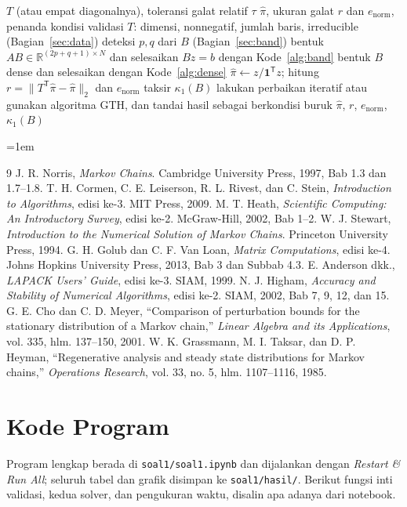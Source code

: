 \documentclass[12pt,a4paper]{article}
\newcommand{\R}{\mathbb{R}}
\newcommand{\T}{\mathsf{T}}
\numberwithin{equation}{section}
\begin{document}
\begin{algorithm}[H]
\caption{Alur yang disarankan untuk menghitung distribusi steady state}
\label{alg:rekomendasi}
\begin{algorithmic}[1]
\Require $T$ (atau empat diagonalnya), toleransi galat relatif $\tau$
\Ensure $\hat\pi$, ukuran galat $r$ dan $e_{\mathrm{norm}}$, penanda kondisi
\State validasi $T$: dimensi, nonnegatif, jumlah baris, irreducible (Bagian~\ref{sec:data})
\State deteksi $p,q$ dari $B$ (Bagian~\ref{sec:band})
  \State bentuk $AB\in\R^{(2p+q+1)\times N}$ dan selesaikan $Bz=b$ dengan Kode~\ref{alg:band}
\Else
  \State bentuk $B$ dense dan selesaikan dengan Kode~\ref{alg:dense}
\EndIf
\State $\hat\pi\gets z/\mathbf1^\T z$; hitung $r=\lVert T^\T\hat\pi-\hat\pi\rVert_2$ dan $e_{\mathrm{norm}}$
\State taksir $\kappa_1(B)$ 
  \State lakukan perbaikan iteratif atau gunakan algoritma GTH, dan tandai hasil sebagai berkondisi buruk
\EndIf
\State \Return $\hat\pi$, $r$, $e_{\mathrm{norm}}$, $\kappa_1(B)$
\end{algorithmic}
\end{algorithm}


\renewcommand{\refname}{Referensi}
\emergencystretch=1em
\begin{thebibliography}{9}
 J. R. Norris, \emph{Markov Chains}. Cambridge University Press, 1997, Bab 1.3 dan 1.7--1.8.
 T. H. Cormen, C. E. Leiserson, R. L. Rivest, dan C. Stein, \emph{Introduction to Algorithms},
  edisi ke-3. MIT Press, 2009.
 M. T. Heath, \emph{Scientific Computing: An Introductory Survey}, edisi ke-2. McGraw-Hill, 2002,
  Bab 1--2.
 W. J. Stewart, \emph{Introduction to the Numerical Solution of Markov Chains}. Princeton
  University Press, 1994.
 G. H. Golub dan C. F. Van Loan, \emph{Matrix Computations}, edisi ke-4. Johns Hopkins University
  Press, 2013, Bab 3 dan Subbab 4.3.
 E. Anderson dkk., \emph{LAPACK Users' Guide}, edisi ke-3. SIAM, 1999.
 N. J. Higham, \emph{Accuracy and Stability of Numerical Algorithms}, edisi ke-2. SIAM, 2002,
  Bab 7, 9, 12, dan 15.
 G. E. Cho dan C. D. Meyer, ``Comparison of perturbation bounds for the stationary distribution of a
  Markov chain,'' \emph{Linear Algebra and its Applications}, vol. 335, hlm. 137--150, 2001.
 W. K. Grassmann, M. I. Taksar, dan D. P. Heyman, ``Regenerative analysis and steady state distributions
  for Markov chains,'' \emph{Operations Research}, vol. 33, no. 5, hlm. 1107--1116, 1985.
\end{thebibliography}

\appendix
\section{Kode Program}\label{lamp:kode}
Program lengkap berada di \texttt{soal1/soal1.ipynb} dan dijalankan dengan \emph{Restart \& Run All}; seluruh tabel
dan grafik disimpan ke \texttt{soal1/hasil/}. Berikut fungsi inti validasi, kedua solver, dan pengukuran waktu, disalin
apa adanya dari notebook.

\end{document}
